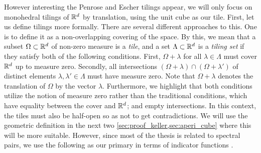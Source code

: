 \documentclass[../thesis.tex]{subfiles}
\begin{document}
However interesting the Penrose and Escher tilings appear, we will only focus on monohedral tilings of $\mathbb{R}^d$ by translation, using the unit cube as our tile. 
First, let us define tilings more formally. There are several different approaches to this. One is to define it as a non-overlapping covering of the space. By this, we mean that a subset $\Omega \subset \mathbb{R}^d$ of non-zero measure is a \emph{tile}, and a set $\Lambda \subset \mathbb{R}^d$ is a \emph{tiling set} if they satisfy both of the following conditions. First, $\Omega+\lambda$ for all $\lambda \in \Lambda$ must cover $\mathbb{R}^d$ up to measure zero. Secondly, all intersections $(\Omega+\lambda) \cap (\Omega+\lambda')$ of distinct elements $\lambda,\lambda' \in \Lambda$ must have measure zero. Note that $\Omega+\lambda$ denotes the translation of $\Omega$ by the vector $\lambda$. Furthermore, we highlight that both conditions utilize the notion of measure zero rather than the traditional conditions, which have equality between the cover and $\mathbb{R}^d$; and empty intersections. In this context, the tiles must also be half-open so as not to get contradictions. We will use the geometric definition in the next two \cref{sec:proof_keller,sec:aperi_cube} where this will be more suitable. However, since most of the thesis is related to spectral pairs, we use the following as our primary  in terms of indicator functions \cite{liDualityPropertiesSpectra2010,kolountzakisTilingsTranslation2010}.
\end{document}
